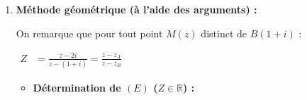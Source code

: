 \documentclass[12pt,a4paper]{article}
\begin{document}
\begin{enumerate}
\begin{enumerate}
\begin{itemize}
            Pour $(x\,;\,y) \neq (1\,;\,1)$, on a :
            
            $
            \begin{aligned}
                M(x\,;\,y) \in (F) &\iff \operatorname{Re}(Z) = 0\\
                &\iff \frac{x^2 + y^2 - x - 3y + 2}{(x - 1)^2 + (y - 1)^2} = 0\\
                &\iff x^2 + y^2 - x - 3y + 2 = 0 \quad \text{avec } (x\,;\,y) \neq (1\,;\,1)
            \end{aligned}
            $
            
            Mettons cette équation sous forme canonique :
            
            $
            \begin{aligned}
                x^2 - x + y^2 - 3y + 2 = 0 &\iff \left(x - \frac{1}{2}\right)^2 - \frac{1}{4} + \left(y - \frac{3}{2}\right)^2 - \frac{9}{4} + 2 = 0\\
                &\iff \left(x - \frac{1}{2}\right)^2 + \left(y - \frac{3}{2}\right)^2 - \frac{10}{4} + \frac{8}{4} = 0\\
                &\iff \left(x - \frac{1}{2}\right)^2 + \left(y - \frac{3}{2}\right)^2 = \frac{1}{2}
            \end{aligned}
            $
            
            Il s'agit de l'équation du cercle $(\mathcal{C})$ de centre $\Omega\left(\dfrac{1}{2}\,;\,\dfrac{3}{2}\right)$ (qui est le milieu du segment $[AB]$) et de rayon $R = \sqrt{\dfrac{1}{2}} = \dfrac{\sqrt{2}}{2} = \dfrac{AB}{2}$.
            
            L'ensemble $(F)$ est donc le \textbf{cercle de diamètre $[AB]$ privé du point $B(1\,;\,1)$}.
        \end{itemize}

        \item \textbf{Méthode géométrique (à l'aide des arguments) :}
        
        On remarque que pour tout point $M(z)$ distinct de $B(1 + i)$ :
        
        $
        \begin{aligned}
            Z &= \frac{z - 2i}{z - (1 + i)} = \frac{z - z_A}{z - z_B}
        \end{aligned}
        $
        
        \begin{itemize}
            \item \textbf{Détermination de $(E)$ ($Z \in \mathbb{R}$) :}
            

\end{itemize}
\end{enumerate}
\end{enumerate}
\end{document}
